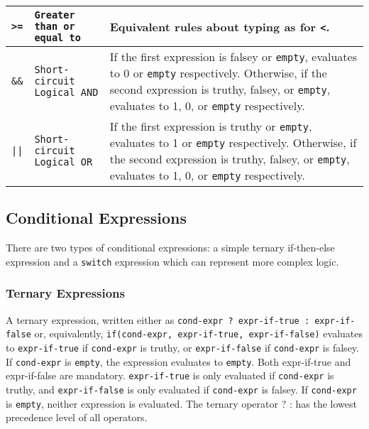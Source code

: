 \begin{longtable}[H]{ |p{2cm}|p{5cm}|p{7cm}|  }
			\rule{0pt}{3ex}\texttt{>=} & \texttt{Greater than or equal to} & {Equivalent rules about typing as for \texttt{<}.} \\ \hline
			\rule{0pt}{3ex}\texttt{\&\&} & \texttt{Short-circuit Logical AND} & {If the first expression is falsey or \texttt{empty}, evaluates to 0 or \texttt{empty} respectively. Otherwise, if the second expression is truthy, falsey, or \texttt{empty}, evaluates to 1, 0, or \texttt{empty} respectively.} \\ \hline
			\rule{0pt}{3ex}\texttt{||} & \texttt{Short-circuit Logical OR} & {If the first expression is truthy or \texttt{empty}, evaluates to 1 or \texttt{empty} respectively. Otherwise, if the second expression is truthy, falsey, or \texttt{empty}, evaluates to 1, 0, or \texttt{empty} respectively.} \\ \hline
			\end{longtable}
			

\subsection{Conditional Expressions}
			There are two types of conditional expressions: a simple ternary if-then-else expression and a \texttt{switch} expression which can represent more complex logic.

\subsubsection{Ternary Expressions}
\label{sec:Ternary}
A ternary expression, written either as \texttt{cond-expr ? expr-if-true : expr-if-false} or, equivalently, \texttt{if(cond-expr, expr-if-true, expr-if-false)} evaluates to \texttt{expr-if-true} if \texttt{cond-expr} is truthy, or \texttt{expr-if-false} if \texttt{cond-expr} is falsey. If \texttt{cond-expr} is \texttt{empty}, the expression evaluates to \texttt{empty}.  Both expr-if-true and expr-if-false are mandatory. \texttt{expr-if-true} is only evaluated if \texttt{cond-expr} is truthy, and \texttt{expr-if-false} is only evaluated if \texttt{cond-expr} is falsey. If \texttt{cond-expr} is \texttt{empty}, neither expression is evaluated. The ternary operator ? : has the lowest precedence level of all operators.

